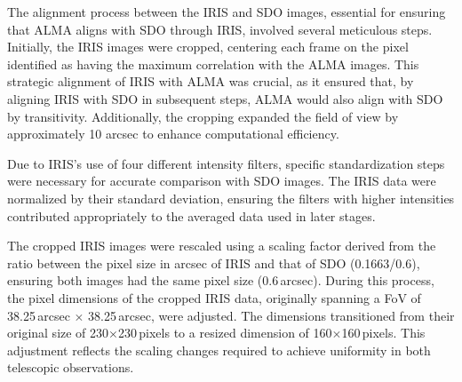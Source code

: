\documentclass[a4paper,alpha-refs]{eSpectra}
\begin{document}
The alignment process between the IRIS and SDO images, essential for ensuring that ALMA aligns with SDO through IRIS, involved several meticulous steps. Initially, the IRIS images were cropped, centering each frame on the pixel identified as having the maximum correlation with the ALMA images. This strategic alignment of IRIS with ALMA was crucial, as it ensured that, by aligning IRIS with SDO in subsequent steps, ALMA would also align with SDO by transitivity. Additionally, the cropping expanded the field of view by approximately 10 arcsec to enhance computational efficiency. 

Due to IRIS's use of four different intensity filters, specific standardization steps were necessary for accurate comparison with SDO images. The IRIS data were normalized by their standard deviation, ensuring the filters with higher intensities contributed appropriately to the averaged data used in later stages.

The cropped IRIS images were rescaled using a scaling factor derived from the ratio between the pixel size in arcsec of IRIS and that of SDO (0.1663/0.6), ensuring both images had the same pixel size (0.6\,arcsec). During this process, the pixel dimensions of the cropped IRIS data, originally spanning a FoV of 38.25\,arcsec $\times$ 38.25\,arcsec, were adjusted. The dimensions transitioned from their original size of 230$\times$230\,pixels to a resized dimension of 160$\times$160\,pixels. This adjustment reflects the scaling changes required to achieve uniformity in both telescopic observations.
\end{document}
